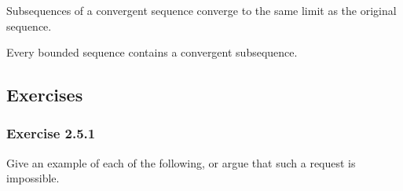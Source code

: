 \begin{tcolorbox}
\begin{thm}
Subsequences of a convergent sequence converge to the same limit as the original sequence.
\end{thm}
\end{tcolorbox}


\begin{tcolorbox}
    \begin{thm}
        Every bounded sequence contains a convergent subsequence.
\end{thm}
\end{tcolorbox}

\subsection{Exercises}


\subsubsection{Exercise 2.5.1} Give an example of each of the following, or argue that such a request is impossible. 


